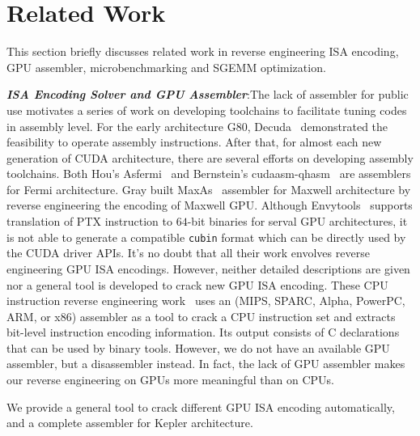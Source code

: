\section{Related Work}
\label{sec:related}
This section briefly discusses related work in reverse engineering ISA encoding, GPU assembler, microbenchmarking and SGEMM optimization.

{\em {\bf ISA Encoding Solver and GPU Assembler}}:The lack of assembler for public use motivates a series of work on developing toolchains to facilitate tuning codes in 
assembly level. 
For the early architecture G80, Decuda~\cite{decuda} demonstrated the feasibility to operate
assembly instructions. After that, for almost each new generation of CUDA architecture, there are several 
efforts on developing assembly toolchains. Both Hou's Asfermi~\cite{asfermi} and Bernstein's 
cudaasm-qhasm~\cite{bernstein2012usable} are assemblers for Fermi architecture. Gray built MaxAs~\cite{maxas} assembler 
for Maxwell architecture by reverse engineering the encoding of Maxwell GPU. 
Although Envytools~\cite{envytools} supports translation of PTX instruction to $64$-bit binaries 
for serval GPU architectures, it is not able to generate a compatible {\tt cubin} format which can be directly used by 
the CUDA driver APIs. %
It's no doubt that all their work envolves reverse engineering GPU ISA
encodings. However, neither detailed descriptions are given nor a general tool is developed to crack
new GPU ISA encoding. 
These CPU instruction reverse engineering work~\cite{collberg1997reverse,hsieh2001reverse} uses an (MIPS, SPARC, Alpha, PowerPC, ARM, or x86) assembler as a tool to crack a CPU instruction set and extracts bit-level instruction encoding information. Its output consists of C declarations that can be used by binary tools. However, we do not have an available GPU assembler, but a disassembler instead. 
In fact, the lack of GPU assembler makes our reverse engineering on GPUs more meaningful than on CPUs. 

We provide a general tool to crack different GPU ISA encoding
automatically, and a complete assembler for Kepler architecture.

